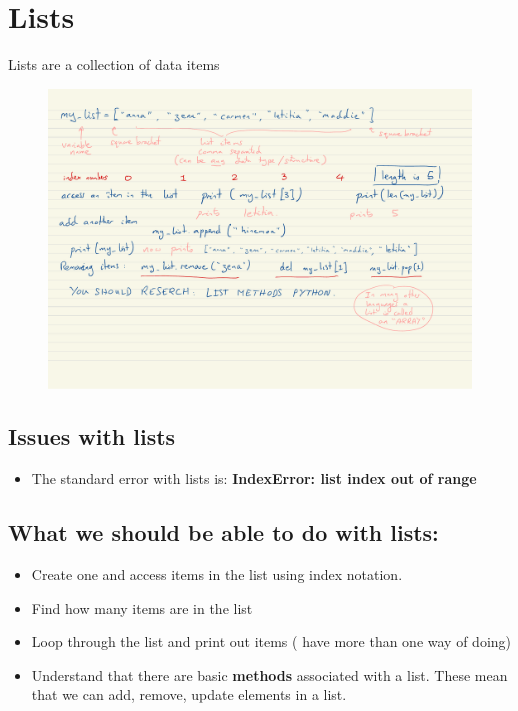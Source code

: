 \documentclass[a4paper,12pt]{article}
\begin{document}


\newpage
\section{Lists}
Lists are a collection of data items

\begin{figure}[!ht]
	\centering
	\includegraphics[width=17cm]{lists.pdf}
\end{figure}





\subsection{Issues with lists}
\begin{itemize}
	\item The standard error with lists is:  \textbf{IndexError: list index out of range}
\end{itemize}
\subsection{What we should be able to do with lists:}
\begin{itemize}
	\item Create one and access items in the list using index notation.
	\item Find how many items are in the list
	\item Loop through the list and print out items ( have more than one way of doing)
	\item Understand that there are basic \textbf{methods} associated with a list. These mean that we can add, remove, update elements in a list.
\end{itemize}
\end{document}
